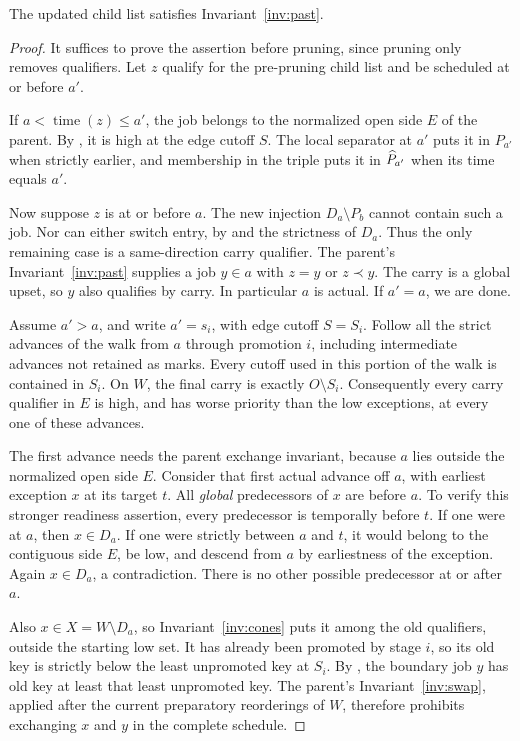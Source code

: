 \begin{lemma}\label{lem:past}
The updated child list satisfies Invariant~\ref{inv:past}.
\end{lemma}
\begin{proof}
It suffices to prove the assertion before pruning, since pruning only
removes qualifiers. Let \(z\) qualify for the pre-pruning child list and be scheduled
at or before \(a'\).

If \(a<\operatorname{time}(z)\le a'\), the job belongs to the normalized
open side \(E\) of the parent. By , it is
high at the edge cutoff \(S\). The local separator at \(a'\) puts
it in \(P_{a'}\) when strictly earlier, and membership in the
triple puts it in \(\widehat P_{a'}\) when its time equals \(a'\).

Now suppose \(z\) is at or before \(a\).
The new injection \(D_a\setminus P_b\) cannot contain such a job.
Nor can either switch entry, by  and the strictness
of \(D_a\). Thus the only remaining case is a same-direction
carry qualifier.
The parent's Invariant~\ref{inv:past} supplies a job \(y\in a\)
with \(z=y\) or \(z\prec y\).
The carry is a global upset, so \(y\) also qualifies by carry.
In particular \(a\) is actual. If \(a'=a\), we are done.

Assume \(a'>a\), and write \(a'=s_i\), with edge cutoff \(S=S_i\).
Follow all the strict advances of the walk from \(a\) through
promotion \(i\), including intermediate advances not retained as marks.
Every cutoff used in this portion of the walk is contained in \(S_i\).
On \(W\), the final carry is exactly \(O\setminus S_i\).
Consequently every carry qualifier in \(E\) is high, and has worse
priority than the low exceptions, at every one of these advances.

The first advance needs the parent exchange invariant, because
\(a\) lies outside the normalized open side \(E\).
Consider that first actual advance off \(a\), with earliest exception
\(x\) at its target \(t\).
All \emph{global} predecessors of \(x\) are before \(a\).
To verify this stronger readiness assertion, every predecessor is
temporally before \(t\). If one were at \(a\), then \(x\in D_a\).
If one were strictly between \(a\) and \(t\), it would belong to
the contiguous side \(E\), be low, and descend from \(a\) by
earliestness of the exception. Again \(x\in D_a\), a contradiction.
There is no other possible predecessor at or after \(a\).

Also \(x\in X=W\setminus D_a\), so Invariant~\ref{inv:cones}
puts it among the old qualifiers, outside the starting low set.
It has already been promoted by stage \(i\), so its old key is
strictly below the least unpromoted key at \(S_i\).
By , the boundary job \(y\) has old key at least
that least unpromoted key.
The parent's Invariant~\ref{inv:swap}, applied after the current
preparatory reorderings of \(W\), therefore prohibits exchanging
\(x\) and \(y\) in the complete schedule.


\end{proof}
